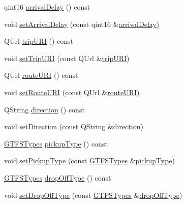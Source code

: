 \begin{DoxyCompactItemize}
\item 
qint16 \mbox{\hyperlink{classQRail_1_1Fragments_1_1Fragment_a0f5ee06943c6cf1dc3ba0e98439e4262}{arrival\+Delay}} () const
\item 
void \mbox{\hyperlink{classQRail_1_1Fragments_1_1Fragment_a2ed5cbd8bc2ff93aea43396a7d9543a6}{set\+Arrival\+Delay}} (const qint16 \&\mbox{\hyperlink{classQRail_1_1Fragments_1_1Fragment_a0f5ee06943c6cf1dc3ba0e98439e4262}{arrival\+Delay}})
\item 
Q\+Url \mbox{\hyperlink{classQRail_1_1Fragments_1_1Fragment_a0aab02000bd98face5322e427ffaa581}{trip\+U\+RI}} () const
\item 
void \mbox{\hyperlink{classQRail_1_1Fragments_1_1Fragment_aa5949184a85b1e21135b83c34647865a}{set\+Trip\+U\+RI}} (const Q\+Url \&\mbox{\hyperlink{classQRail_1_1Fragments_1_1Fragment_a0aab02000bd98face5322e427ffaa581}{trip\+U\+RI}})
\item 
Q\+Url \mbox{\hyperlink{classQRail_1_1Fragments_1_1Fragment_a9313e0c67c93f2e7482071054c005dae}{route\+U\+RI}} () const
\item 
void \mbox{\hyperlink{classQRail_1_1Fragments_1_1Fragment_a8d04622c12e0cafe2d1020919095a5d9}{set\+Route\+U\+RI}} (const Q\+Url \&\mbox{\hyperlink{classQRail_1_1Fragments_1_1Fragment_a9313e0c67c93f2e7482071054c005dae}{route\+U\+RI}})
\item 
Q\+String \mbox{\hyperlink{classQRail_1_1Fragments_1_1Fragment_a245aaaea9da4258cba1fa53335b05546}{direction}} () const
\item 
void \mbox{\hyperlink{classQRail_1_1Fragments_1_1Fragment_a9a0d8e14fa56b6c9588bd58f363cbec5}{set\+Direction}} (const Q\+String \&\mbox{\hyperlink{classQRail_1_1Fragments_1_1Fragment_a245aaaea9da4258cba1fa53335b05546}{direction}})
\item 
\mbox{\hyperlink{classQRail_1_1Fragments_1_1Fragment_ae3c308ba6dec16f36ecc5dba59f35af3}{G\+T\+F\+S\+Types}} \mbox{\hyperlink{classQRail_1_1Fragments_1_1Fragment_afbddff790b1d207eff7adafba09f6e7c}{pickup\+Type}} () const
\item 
void \mbox{\hyperlink{classQRail_1_1Fragments_1_1Fragment_a8d4b0f9aa02575e70ff2799a4e3a53ff}{set\+Pickup\+Type}} (const \mbox{\hyperlink{classQRail_1_1Fragments_1_1Fragment_ae3c308ba6dec16f36ecc5dba59f35af3}{G\+T\+F\+S\+Types}} \&\mbox{\hyperlink{classQRail_1_1Fragments_1_1Fragment_afbddff790b1d207eff7adafba09f6e7c}{pickup\+Type}})
\item 
\mbox{\hyperlink{classQRail_1_1Fragments_1_1Fragment_ae3c308ba6dec16f36ecc5dba59f35af3}{G\+T\+F\+S\+Types}} \mbox{\hyperlink{classQRail_1_1Fragments_1_1Fragment_a8cb44b415a121dfa2b0c6046df4bea27}{drop\+Off\+Type}} () const
\item 
void \mbox{\hyperlink{classQRail_1_1Fragments_1_1Fragment_adf2f6016bb7f1fea030e910b9a062735}{set\+Drop\+Off\+Type}} (const \mbox{\hyperlink{classQRail_1_1Fragments_1_1Fragment_ae3c308ba6dec16f36ecc5dba59f35af3}{G\+T\+F\+S\+Types}} \&\mbox{\hyperlink{classQRail_1_1Fragments_1_1Fragment_a8cb44b415a121dfa2b0c6046df4bea27}{drop\+Off\+Type}})
\end{DoxyCompactItemize}


